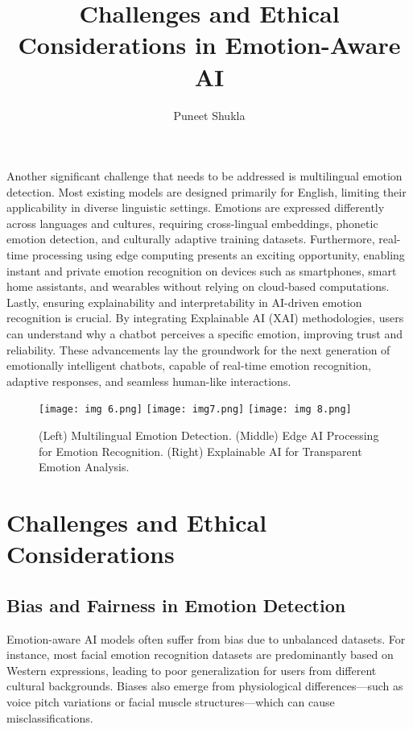 \documentclass[a4paper,10pt]{article}
\begin{document}
\noindent Another significant challenge that needs to be addressed is multilingual emotion detection. Most existing models are designed primarily for English, limiting their applicability in diverse linguistic settings. Emotions are expressed differently across languages and cultures, requiring cross-lingual embeddings, phonetic emotion detection, and culturally adaptive training datasets. Furthermore, real-time processing using edge computing presents an exciting opportunity, enabling instant and private emotion recognition on devices such as smartphones, smart home assistants, and wearables without relying on cloud-based computations. Lastly, ensuring explainability and interpretability in AI-driven emotion recognition is crucial. By integrating Explainable AI (XAI) methodologies, users can understand why a chatbot perceives a specific emotion, improving trust and reliability. These advancements lay the groundwork for the next generation of emotionally intelligent chatbots, capable of real-time emotion recognition, adaptive responses, and seamless human-like interactions. 

\begin{figure}[h]
    \centering
    \texttt{[image: img 6.png]}
    \hfill
    \texttt{[image: img7.png]}
    \hfill
    \texttt{[image: img 8.png]}
    \caption{(Left) Multilingual Emotion Detection. (Middle) Edge AI Processing for Emotion Recognition. (Right) Explainable AI for Transparent Emotion Analysis.}
    \label{fig:additional_considerations}
\end{figure}

\title{Challenges and Ethical Considerations in Emotion-Aware AI}
\author{Puneet Shukla}
\date{}

\maketitle

\section{Challenges and Ethical Considerations}

\subsection{Bias and Fairness in Emotion Detection}
Emotion-aware AI models often suffer from bias due to unbalanced datasets. For instance, most facial emotion recognition datasets are predominantly based on Western expressions, leading to poor generalization for users from different cultural backgrounds. Biases also emerge from physiological differences—such as voice pitch variations or facial muscle structures—which can cause misclassifications.
\end{document}
